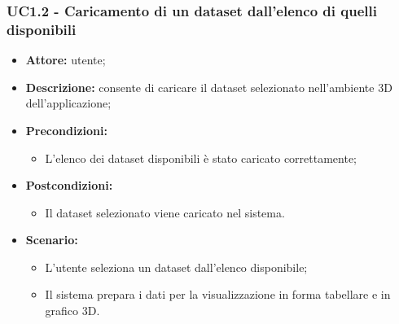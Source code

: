 \subsubsection{UC1.2 - Caricamento di un dataset dall'elenco di quelli disponibili}
\begin{itemize}
    \item \textbf{Attore:} utente;
    \item \textbf{Descrizione:} consente di caricare il dataset selezionato nell'ambiente 3D dell'applicazione;
    \item \textbf{Precondizioni:}
    \begin{itemize}
        \item L'elenco dei dataset disponibili è stato caricato correttamente;
    \end{itemize}
    \item \textbf{Postcondizioni:}
    \begin{itemize}
        \item Il dataset selezionato viene caricato nel sistema.
    \end{itemize}
    \item \textbf{Scenario:}
    \begin{itemize}
        \item L'utente seleziona un dataset dall'elenco disponibile;
        \item Il sistema prepara i dati per la visualizzazione in forma tabellare e in grafico 3D.
    \end{itemize}
\end{itemize}
\newpage
